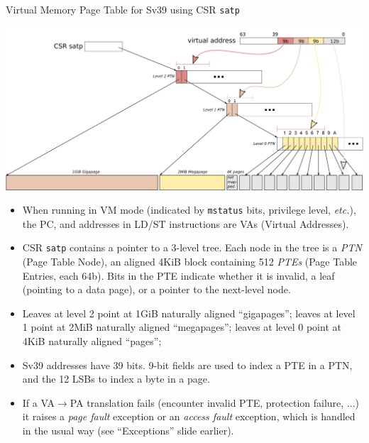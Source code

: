 \documentclass{article}
\newcommand{\etc}{\emph{etc.}}
\begin{document}
\clearpage


\begin{center}
  {\Huge
    Virtual Memory Page Table for Sv39 using CSR {\tt satp}}

  \vspace*{0.1in}

  \includegraphics[width=9in]{Figs/VM_Sv39.png}

  \vspace*{0.2in}

  \begin{minipage}[t]{9.5in}
    \begin{itemize}\large

    \item When running in VM mode (indicated by {\tt mstatus} bits,
      privilege level, {\etc}), the PC, and addresses in LD/ST
      instructions are VAs (Virtual Addresses).

    \item CSR {\tt satp} contains a pointer to a 3-level tree.  Each
      node in the tree is a \emph{PTN} (Page Table Node), an aligned
      4KiB block containing 512 \emph{PTEs} (Page Table Entries, each
      64b).  Bits in the PTE indicate whether it is invalid, a leaf
      (pointing to a data page), or a pointer to the next-level node.

    \item Leaves at level 2 point at 1GiB naturally aligned ``gigapages'';
      leaves at level 1 point at 2MiB naturally aligned ``megapages'';
      leaves at level 0 point at 4KiB naturally aligned ``pages'';

    \item Sv39 addresses have 39 bits. 9-bit fields are used to index
      a PTE in a PTN, and the 12 LSBs to index a byte in a page.

      \item If a VA$\rightarrow$PA translation fails (encounter
        invalid PTE, protection failure, ...) it raises a \emph{page
        fault} exception or an \emph{access fault} exception, which is
        handled in the usual way (see ``Exceptions'' slide earlier).
    \end{itemize}
  \end{minipage}
\end{center}
\end{document}
